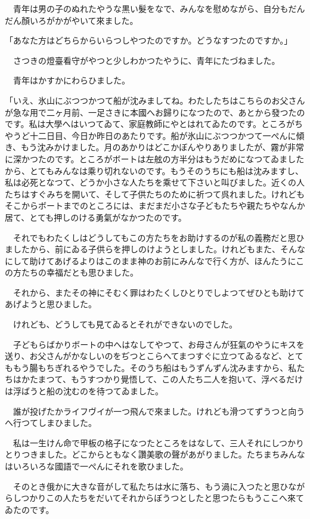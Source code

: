 \documentclass[tate,paper=b6j,jafontsize=9pt]{jlreq}
\begin{document}
　青年は男の子のぬれたやうな黒い髮をなで、みんなを慰めながら、自分もだんだん顏いろがかがやいて來ました。

「あなた方はどちらからいらつしやつたのですか。どうなすつたのですか。」

　さつきの燈臺看守がやつと少しわかつたやうに、青年にたづねました。

　青年はかすかにわらひました。

「いえ、氷山にぶつつかつて船が沈みましてね。わたしたちはこちらのお父さんが急な用で二ヶ月前、一足さきに本國へお歸りになつたので、あとから發つたのです。私は大學へはいつてゐて、家庭教師にやとはれてゐたのです。ところがちやうど十二日目、今日か昨日のあたりです。船が氷山にぶつつかつて一ぺんに傾き、もう沈みかけました。月のあかりはどこかぼんやりありましたが、霧が非常に深かつたのです。ところがボートは左舷の方半分はもうだめになつてゐましたから、とてもみんなは乘り切れないのです。もうそのうちにも船は沈みますし、私は必死となつて、どうか小さな人たちを乘せて下さいと叫びました。近くの人たちはすぐみちを開いて、そして子供たちのために祈つて呉れました。けれどもそこからボートまでのところには、まだまだ小さな子どもたちや親たちやなんか居て、とても押しのける勇氣がなかつたのです。

　それでもわたくしはどうしてもこの方たちをお助けするのが私の義務だと思ひましたから、前にゐる子供らを押しのけようとしました。けれどもまた、そんなにして助けてあげるよりはこのまま神のお前にみんなで行く方が、ほんたうにこの方たちの幸福だとも思ひました。

　それから、またその神にそむく罪はわたくしひとりでしよつてぜひとも助けてあげようと思ひました。

　けれども、どうしても見てゐるとそれができないのでした。

　子どもらばかりボートの中へはなしてやつて、お母さんが狂氣のやうにキスを送り、お父さんがかなしいのをぢつとこらへてまつすぐに立つてゐるなど、とてももう腸もちぎれるやうでした。そのうち船はもうずんずん沈みますから、私たちはかたまつて、もうすつかり覺悟して、この人たち二人を抱いて、浮べるだけは浮ばうと船の沈むのを待つてゐました。

　誰が投げたかライフヴイが一つ飛んで來ました。けれども滑つてずうつと向うへ行つてしまひました。

　私は一生けん命で甲板の格子になつたところをはなして、三人それにしつかりとりつきました。どこからともなく讚美歌の聲があがりました。たちまちみんなはいろいろな國語で一ぺんにそれを歌ひました。

　そのとき俄かに大きな音がして私たちは水に落ち、もう渦に入つたと思ひながらしつかりこの人たちをだいてそれからぼうつとしたと思つたらもうここへ來てゐたのです。
\end{document}
